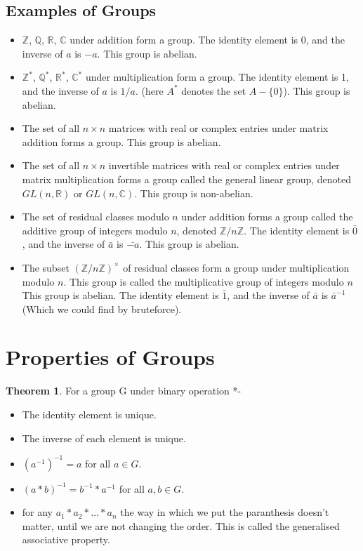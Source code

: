 \documentclass[12pt,a4paper,oneside]{report}
\theoremstyle{definition}
\newtheorem{theorem}{Theorem}
\begin{document}
\subsection{Examples of Groups}
\begin{itemize}
  \item $\mathbb{Z}$, $\mathbb{Q}$, $\mathbb{R}$, $\mathbb{C}$  under addition form a group. The identity element is 0, and the inverse of $a$ is $-a$. This group is abelian.
  \item $\mathbb{Z}^{*}$, $\mathbb{Q}^{*}$, $\mathbb{R}^{*}$, $\mathbb{C}^{*}$ under multiplication form a group. The identity element is 1, and the inverse of $a$ is $1/a$. (here $A^{*}$ denotes the set $A-\{0\}$). This group is abelian.
  \item The set of all $n \times n$ matrices with real or complex entries under matrix addition forms a group. This group is abelian.
  \item The set of all $n \times n$ invertible matrices with real or complex entries under matrix multiplication forms a group called the general linear group, denoted $GL(n, \mathbb{R})$ or $GL(n, \mathbb{C})$. This group is non-abelian.
  \item The set of residual classes modulo $n$ under addition forms a group called the additive group of integers modulo $n$, denoted $\mathbb{Z}/n\mathbb{Z}$. The identity element is $\bar{0}$, and the inverse of $\bar{a}$ is $\bar{-a}$. This group is abelian.
  \item The subset ${(\mathbb{Z}/n\mathbb{Z})}^{\times}$ of residual classes  form a group under multiplication modulo $n$. This group is called the multiplicative group of integers modulo $n$ This group is abelian. The identity element is $\bar{1}$, and the inverse of $\bar{a}$ is $\bar{a}^{-1}$(Which we could find by bruteforce).
\end{itemize}
\section{Properties of Groups}
\begin{theorem}
For a group G under binary operation *-
\begin{itemize}
  \item The identity element is unique.
  \item The inverse of each element is unique.
  \item $(a^{-1})^{-1} = a$ for all $a \in G$.
  \item $(a * b)^{-1} = b^{-1} * a^{-1}$ for all $a, b \in G$.
  \item for any $a_1*a_2* \ldots*a_n$ the way in which we put the paranthesis doesn't matter, until we are not changing the order. This is called the generalised associative property.
\end{itemize}
\end{theorem}
\end{document}
